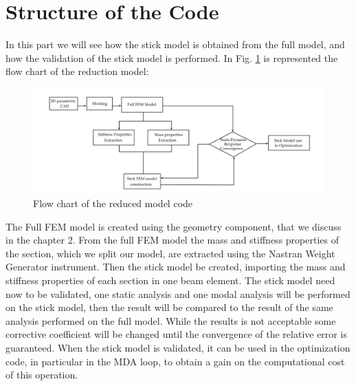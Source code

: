 \section{Structure of the Code}
In this part we will see how the stick model is obtained from the full model, and how the validation of the stick model is performed. In Fig. \ref{fig:4_2} is represented the flow chart of the reduction model:
\begin{figure}[H]
	\centering
	\includegraphics[width = 1\textwidth]{./Immagini/4_2.png}
	\caption{Flow chart of the reduced model code }
	\label{fig:4_2}
\end{figure}
The Full FEM model is created using the geometry component, that we discuss in the chapter 2. From the full FEM model the mass and stiffness properties of the section, which we split our model, are extracted using the Nastran Weight Generator instrument. Then the stick model be created, importing the mass and stiffness properties of each section in one beam element. The stick model need now to be validated, one static analysis and one modal analysis will be performed on the stick model, then the result will be compared to the result of the same analysis performed on the full model. While the results is not acceptable some corrective coefficient will be changed until the convergence of the relative error is guaranteed. When the stick model is validated, it can be used in the optimization code, in particular in the MDA loop, to obtain a gain on the computational cost of this operation.
